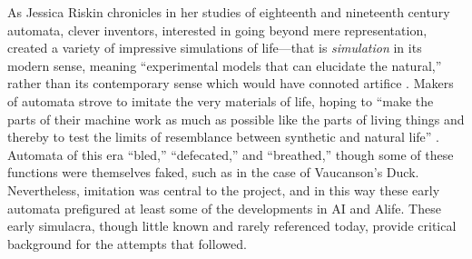 As Jessica Riskin chronicles in her studies of eighteenth and
nineteenth century automata, clever inventors, interested in going
beyond mere representation, created a variety of impressive
simulations of life---that is \emph{simulation} in its modern sense, meaning
``experimental models that can elucidate the natural,'' rather than its
contemporary sense which would have connoted artifice \cite[p. 605--606]{riskinDuck}.
Makers of automata strove to imitate the very materials of life,
hoping to ``make the parts of their machine work as much as possible
like the parts of living things and thereby to test the limits of
resemblance between synthetic and natural life'' \cite[p. 606]{riskinDuck}.
Automata of this era ``bled,'' ``defecated,'' and ``breathed,'' though some
of these functions were themselves faked, such as in the case of
Vaucanson's Duck. Nevertheless, imitation was central to the project,
and in this way these early automata prefigured at least some of the
developments in AI and Alife. These early simulacra, though little known and
rarely referenced today, provide critical background for the attempts
that followed. 

